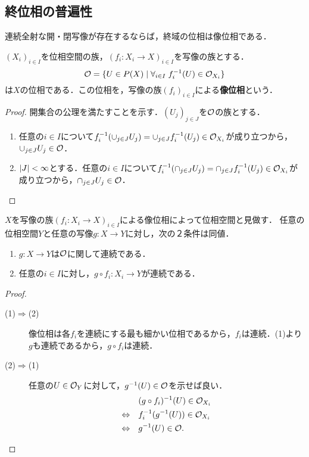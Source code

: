 \documentclass[uplatex,dvipdfmx]{jsreport}
\begin{document}
\subsection{終位相の普遍性}

\begin{tcolorbox}[colframe=ForestGreen, colback=ForestGreen!10!white,breakable,colbacktitle=ForestGreen!40!white,coltitle=black,fonttitle=\bfseries\sffamily,
title=]
    連続全射な開・閉写像が存在するならば，終域の位相は像位相である．
\end{tcolorbox}

\begin{proposition}[像位相の特徴付け]
    $(X_i)_{i\in I}$を位相空間の族，$(f_i:X_i\to X)_{i\in I}$を写像の族とする．
    \[ \mathcal{O}=\{U\in P(X)\mid \forall_{i\in I}\; f^{-1}_i(U)\in\mathcal{O}_{X_i}\} \]
    は$X$の位相である．この位相を，写像の族$(f_i)_{i\in I}$による\textbf{像位相}という．
\end{proposition}
\begin{proof}
    開集合の公理を満たすことを示す．$(U_j)_{j\in J}$を$\mathcal{O}$の族とする．
    \begin{enumerate}
        \item 任意の$i\in I$について$f^{-1}_i(\cup_{j\in J}U_j)=\cup_{j\in J}f^{-1}_i(U_j)\in\mathcal{O}_{X_i}$が成り立つから，$\cup_{j\in J}U_j\in\mathcal{O}$．
        \item $\lvert J\rvert<\infty$とする．任意の$i\in I$について$f^{-1}_i(\cap_{j\in J}U_j)=\cap_{j\in J}f^{-1}_i(U_j)\in\mathcal{O}_{X_i}$が成り立つから，$\cap_{j\in J}U_j\in\mathcal{O}$．
    \end{enumerate}
\end{proof}

\begin{proposition}[終位相の普遍性]
    $X$を写像の族$(f_i:X_i\to X)_{i\in I}$による像位相によって位相空間と見做す．
    任意の位相空間$Y$と任意の写像$g:X\to Y$に対し，次の２条件は同値．
    \begin{enumerate}
        \item $g:X\to Y$は$\mathcal{O}$に関して連続である．
        \item 任意の$i\in I$に対し，$g\circ f_i:X_i\to Y$が連続である．
    \end{enumerate}
\end{proposition}
\begin{proof}\mbox{}
    \begin{description}
        \item[(1)$\Rightarrow$(2)] 像位相は各$f_i$を連続にする最も細かい位相であるから，$f_i$は連続．(1)より$g$も連続であるから，$g\circ f_i$は連続．
        \item[(2)$\Rightarrow$(1)] 任意の$U\in\mathcal{O}_Y$に対して，$g^{-1}(U)\in\mathcal{O}$を示せば良い．
        \begin{align*}
            &(g\circ f_i)^{-1}(U)\in\mathcal{O}_{X_i}\\
            \Leftrightarrow\quad&f^{-1}_i(g^{-1}(U))\in\mathcal{O}_{X_i}\\
            \Leftrightarrow\quad&g^{-1}(U)\in\mathcal{O}.
        \end{align*}
    \end{description}
\end{proof}
\end{document}
